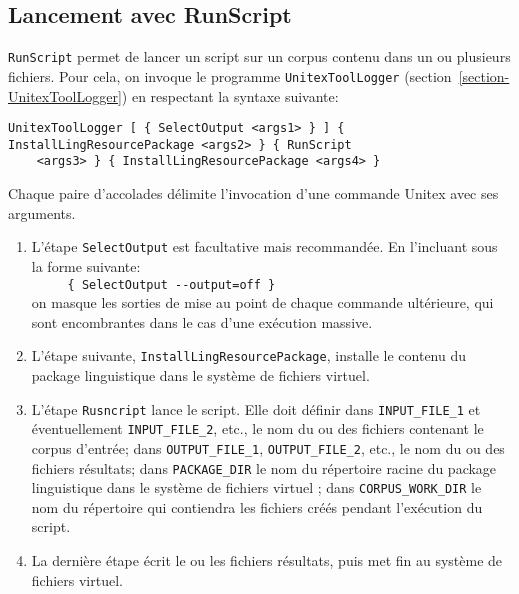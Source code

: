 \subsection{Lancement avec RunScript}
\label{section-runscript}
\verb$RunScript$ permet de lancer un script sur un corpus contenu dans un ou plusieurs fichiers.
Pour cela, on invoque le programme \verb$UnitexToolLogger$ (section~\ref{section-UnitexToolLogger})
en respectant la syntaxe suivante:

\begin{Verbatim}[fontsize=\small,fontfamily=helvetica]
UnitexToolLogger [ { SelectOutput <args1> } ] { InstallLingResourcePackage <args2> } { RunScript
    <args3> } { InstallLingResourcePackage <args4> }
\end{Verbatim}

\noindent Chaque paire d'accolades délimite l'invocation d'une commande Unitex avec ses arguments.

\begin{enumerate}
\item L'étape \verb$SelectOutput$ est facultative mais recommandée. En l'incluant sous la forme
suivante:\\
\verb$     { SelectOutput --output=off }$\\
on masque les sorties de mise au point de chaque commande ultérieure, qui sont encombrantes
dans le cas d'une exécution massive.
\item L'étape suivante, \verb$InstallLingResourcePackage$, installe le contenu du package linguistique
dans le système de fichiers virtuel.
\item L'étape \verb$Rusncript$ lance le script. Elle doit définir dans  \verb$INPUT_FILE_1$ et
éventuellement \verb$INPUT_FILE_2$, etc., le nom du ou des fichiers contenant le corpus d'entrée; dans
\verb$OUTPUT_FILE_1$, \verb$OUTPUT_FILE_2$, etc., le nom du ou des fichiers résultats;
dans \verb$PACKAGE_DIR$ le nom du répertoire racine du package linguistique dans le système
de fichiers virtuel ; dans \verb$CORPUS_WORK_DIR$ le nom du répertoire qui contiendra les fichiers
créés pendant l'exécution du script.
\item La dernière étape écrit le ou les fichiers résultats, puis met fin au système de fichiers virtuel.
\end{enumerate}

